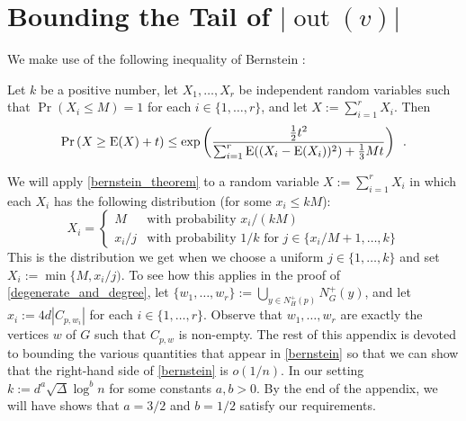 \documentclass{patmorin}
\DeclareMathOperator{\outn}{out}
\begin{document}





\appendix

\section{Bounding the Tail of \texorpdfstring{\boldmath$|\outn(v)|$}{out(v)}}

We make use of the following inequality of Bernstein \cite[Corollary~2.11]{boucheron.lugosi.ea:concentration}:

\begin{thm}\label{bernstein_theorem}
  Let $k$ be a positive number, let $X_1,\ldots,X_r$ be independent random variables such that $\Pr(X_i\le M)=1$ for each $i\in\{1,\ldots,r\}$, and let $X:=\sum_{i=1}^r X_i$. Then
  \begin{equation}
    \Pr\left(X \ge \mathrm{E}(X)+ t\right)
      \le \exp\left(\frac{\tfrac{1}{2}t^2}{\sum_{i=1}^r \mathrm{E}((X_i-\mathrm{E}(X_i))^2)+\tfrac{1}{3}Mt}\right) \enspace . \label{bernstein}
  \end{equation}
\end{thm}
We will apply \cref{bernstein_theorem} to a random variable $X:=\sum_{i=1}^r X_i$ in which each $X_i$ has the following distribution (for some $x_i\le kM$):
\[
  X_i = \begin{cases}
          M & \text{with probability $x_i/(kM)$} \\
          x_i/j & \text{with probability $1/k$ for $j\in\{x_i/M+1,\ldots,k\}$}
        \end{cases}
\]
This is the distribution we get when we choose a uniform $j\in\{1,\ldots,k\}$ and set $X_i:=\min\{M,x_i/j)$.  To see how this applies in the proof of \cref{degenerate_and_degree}, let $\{w_1,\ldots,w_r\}:=\bigcup_{y\in N^+_H(p)} N^+_G(y)$, and let $x_i:=4d|C_{p,w_i}|$ for each $i\in\{1,\ldots,r\}$.  Observe that $w_1,\ldots,w_r$ are exactly the vertices $w$ of $G$ such that $C_{p,w}$ is non-empty.  The rest of this appendix is devoted to bounding the various quantities that appear in \cref{bernstein} so that we can show that the right-hand side of \cref{bernstein} is $o(1/n)$.  In our setting $k:=d^a\sqrt{\Delta}\log^b n$ for some constants $a,b>0$.  By the end of the appendix, we will have shows that $a=3/2$ and $b=1/2$ satisfy our requirements.
\end{document}
